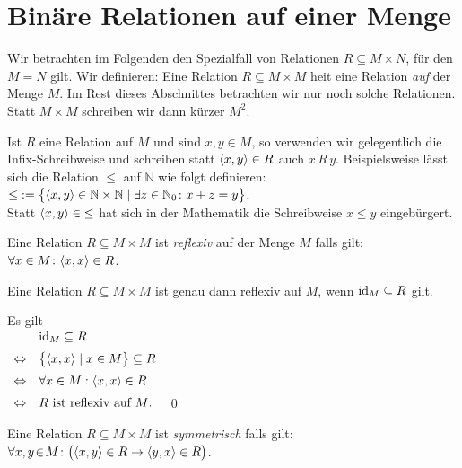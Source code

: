 \section{Bin\"{a}re Relationen auf einer Menge}
Wir betrachten im Folgenden den Spezialfall von Relationen $R \subseteq M \times N$, f\"{u}r
den $M = N$ gilt.  Wir definieren:
Eine Relation $R \subseteq M \times M$ hei\3t eine Relation \emph{auf} der Menge $M$.
Im Rest dieses Abschnittes betrachten wir nur noch solche Relationen. 
Statt $M \times M$ schreiben wir dann k\"{u}rzer $M^2$.

Ist $R$ eine Relation auf $M$ und sind $x, y \in M$, so verwenden wir gelegentlich die
Infix-Schreibweise und schreiben statt
$\pair(x,y) \in R$ auch $x\, R\, y$.  Beispielsweise l\"{a}sst sich die Relation $\leq$ 
auf $\mathbb{N}$ wie folgt definieren: 
\\[0.2cm]
\hspace*{1.3cm}
 $\leq\; := \bigl\{ \pair(x,y) \in \mathbb{N} \times \mathbb{N} \mid \exists z \in \mathbb{N}_0 \colon x + z = y \bigr\}$.
\\[0.2cm]
Statt $\pair(x,y) \in\; \leq$ hat sich in der Mathematik die Schreibweise $x \leq y$ eingeb\"{u}rgert.
  
\begin{Definition}[reflexiv] 
Eine Relation $R \subseteq M \times M$  ist \emph{reflexiv} auf der Menge $M$ falls gilt: \\[0.2cm]
\hspace*{1.3cm} $\forall x\in M \colon \pair(x,x) \in R$. \eox
\end{Definition}

\begin{Satz}
Eine Relation $R \subseteq M \times M$ ist genau dann reflexiv auf $M$, wenn $\mbox{\rm id}_M \subseteq R$ gilt.
\end{Satz}

\proof
Es gilt
\\[0.2cm]
\hspace*{1.3cm}
$
\begin{array}[b]{cl}
                & \mathrm{id}_M \subseteq R \\[0.2cm]
\Leftrightarrow & \bigl\{ \pair(x,x) \mid x \in M \bigr\} \subseteq R \\[0.2cm] 
\Leftrightarrow & \forall x \in M: \pair(x,x) \in R \\[0.2cm] 
\Leftrightarrow & \mbox{$R$ ist reflexiv auf $M$.}  
\end{array}
$
\qed

\begin{Definition}[symmetrisch]
Eine Relation $R \subseteq M \times M$  ist \emph{symmetrisch} falls gilt: \\[0.2cm]
\hspace*{1.3cm} 
$\forall x,y\el M \colon \bigl(\pair(x,y) \in R \rightarrow\pair(y,x)\in R\bigr)$. \eox
\end{Definition}

